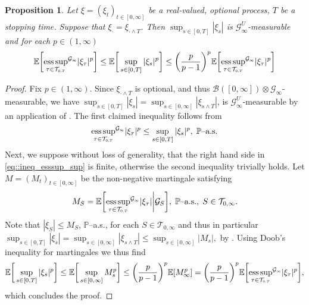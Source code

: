 \documentclass[10pt]{article} %
\newtheorem{proposition}[theorem]{Proposition}
\newcommand\cB{\mathcal B}
\newcommand\cG{\mathcal G}
\newcommand\cT{\mathcal T}
\newcommand{\smalltext}[1]{\text{\fontsize{4}{4}\selectfont$#1$}}
\def \E{\mathbb{E}}
\def \P{\mathbb{P}}
\newcommand{\1}{\mathbf{1}}
\begin{document}
\begin{proposition}\label{prop::equiv_integ_xi}
	Let $\xi = (\xi_t)_{t \in [0,\infty]}$ be a real-valued, optional process, $T$ be a stopping time. Suppose that $\xi_\cdot = \xi_{\cdot \land T}$. Then $\sup_{s \in [0,T]}|\xi_s|$ is $\cG^U_\infty$-measurable and for each $p \in (1,\infty)$
	\begin{equation}\label{eq::ineq_esssup_sup}
		\E\bigg[ \underset{\tau \in \cT_{\smalltext{0}\smalltext{,}\smalltext{T}}}{\rm ess\,sup}^{\cG_\smalltext{\infty}}|\xi_\tau|^p \bigg] \leq \E\bigg[\sup_{s \in [0,T]} |\xi_s|^p\bigg] \leq \bigg(\frac{p}{p-1}\bigg)^p \E\bigg[ \underset{\tau \in \cT_{\smalltext{0}\smalltext{,}\smalltext{T}}}{\rm ess\,sup}^{\cG_\smalltext{\infty}}|\xi_\tau|^p \bigg]
	\end{equation}
\end{proposition}

\begin{proof} 
	Fix $p \in (1,\infty)$. Since $\xi_{\cdot \land T}$ is optional, and thus $\cB([0,\infty]) \otimes \cG_\infty$-measurable, we have $\sup_{s \in [0,T]} |\xi_s| = \sup_{s \in [0,\infty]} |\xi_{s \land T}|$, is $\cG^U_\infty$-measurable by an application of \cite[Proposition 2.21]{karoui2013capacities}. The first claimed inequality follows from
	\begin{equation*}
		\underset{\tau \in \cT_{\smalltext{0}\smalltext{,}\smalltext{T}}}{\rm ess\,sup}^{\cG_\smalltext{\infty}} |\xi_\tau|^p \leq \sup_{s \in [0,T]} |\xi_s|^p, \; \text{$\P$--a.s.}
	\end{equation*}
	Next, we suppose without loss of generality, that the right hand side in \eqref{eq::ineq_esssup_sup} is finite, otherwise the second inequality trivially holds. Let $M = (M_t)_{t \in [0,\infty]}$ be the non-negative martingale satisfying
	\begin{equation*}
		M_S = \E\bigg[ \underset{\tau \in \cT_{\smalltext{0}\smalltext{,}\smalltext{T}}}{\rm ess\,sup}^{\cG_\smalltext{\infty}} |\xi_\tau| \bigg| \cG_S \bigg], \; \text{$\P$--a.s.}, \; S \in \cT_{0,\infty}.
	\end{equation*}
	Note that $|\xi_S| \leq M_S$, $\P$--a.s., for each $S \in \cT_{0,\infty}$ and thus in particular $\sup_{s \in [0,T]} |\xi_s| = \sup_{s \in [0,\infty]} |\xi_{s \land T}| \leq \sup_{s \in [0,\infty]} |M_s|,$
	by . Using Doob's inequality for martingales we thus find
	\begin{equation*}
		\E\bigg[\sup_{s \in [0,T]} |\xi_s|^p\bigg] \leq \E\bigg[\sup_{s \in [0,\infty]} M_s^p\bigg] \leq \bigg(\frac{p}{p-1}\bigg)^p\E[ M_\infty^p ] = \bigg(\frac{p}{p-1}\bigg)^p \E\bigg[\underset{\tau \in \cT_{\smalltext{0}\smalltext{,}\smalltext{T}}}{\rm ess\,sup}^{\cG_\smalltext{\infty}} |\xi_\tau|^p \bigg],
	\end{equation*}
	which concludes the proof.
\end{proof}



{\small
}
\end{document}
